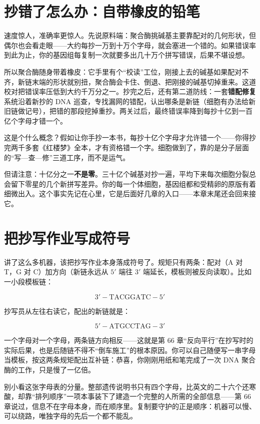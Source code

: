 \section{抄错了怎么办：自带橡皮的铅笔}

速度惊人，准确率更惊人。先说原料端：聚合酶挑碱基主要靠配对的几何形状，但偶尔也会看走眼——大约每抄一万到十万个字母，就会塞进一个错的。如果错误率到此为止，你的基因组每复制一次就要多出几十万个拼写错误，后果不堪设想。

所以聚合酶随身带着橡皮：它手里有个“校读”工位，刚接上去的碱基如果配对不齐，新链末端的形状就别扭，聚合酶会卡住、倒退、把刚接的碱基切掉重来。这道校对把错误率压低到大约千万分之一。抄完之后，还有第二道防线：一套\textbf{错配修复}系统沿着新抄的 DNA 巡查，专找漏网的错配，认出哪条是新链（细胞有办法给新旧链做记号），把错的那段挖掉重抄。两关过后，最终错误率降到每抄十亿到一百亿个字母才错一个。

这是个什么概念？假如让你手抄一本书，每抄十亿个字母才允许错一个——你得抄完两千多套《红楼梦》全本，才有资格错一个字。细胞做到了，靠的是分子层面的“写—查—修”三道工序，而不是运气。

但请注意：十亿分之一\textbf{不是零}。三十亿个碱基对抄一遍，平均下来每次细胞分裂总会留下零星的几个新拼写差异。你的每一个体细胞，基因组都和受精卵的原版有着细微出入。这个事实先记在心里，它是后面好几章的入口——本章末尾还会回来接它。

\section{把抄写作业写成符号}

讲了这么多机器，该把抄写作业本身落成符号了。规矩只有两条：配对（A 对 T，G 对 C）加方向（新链永远从 $5'$ 端往 $3'$ 端延长，模板则被反向读取）。比如一小段模板链：

\[3'-\mathrm{TACGGATC}-5'\]

抄写员从左往右读它，配出的新链就是：

\[5'-\mathrm{ATGCCTAG}-3'\]

一个字母对一个字母，两条链方向相反——这就是第 66 章“反向平行”在抄写时的实际后果，也是后随链不得不“倒车施工”的根本原因。你可以自己随便写一串字母当模板，按这两条规矩配出互补链：恭喜，你刚刚用纸和笔完成了一次 DNA 聚合酶的工作，只是慢了一亿倍。

别小看这张字母表的分量。整部遗传说明书只有四个字母，比英文的二十六个还寒酸，却靠“排列顺序”一项本事装下了建造一个完整的人所需的全部信息——第 66 章说过，信息不在字母本身，而在顺序里。复制要守护的正是顺序：机器可以慢、可以绕路，唯独字母的先后一个都不能乱。

